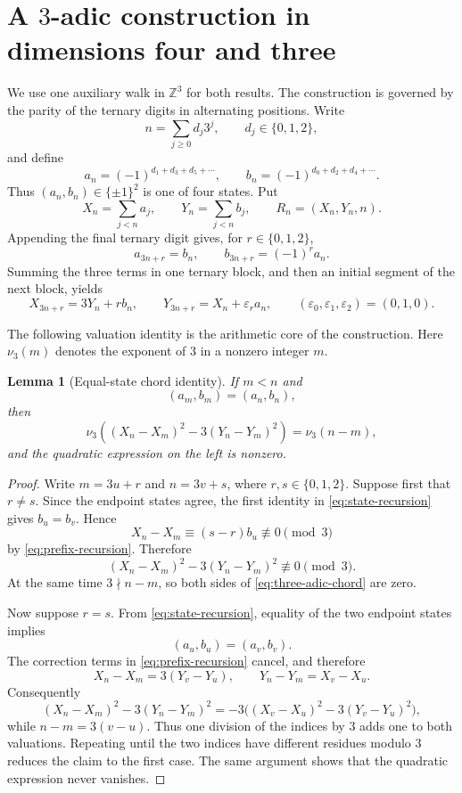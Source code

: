 \documentclass[11pt]{article}
\newtheorem*{lemma}{Lemma}
\begin{document}
\section{A $3$-adic construction in dimensions four and three}
\label{sec:three-four}

We use one auxiliary walk in $\mathbb Z^3$ for both results.  The
construction is governed by the parity of the ternary digits in alternating
positions.  Write
\[
 n=\sum_{j\ge 0} d_j3^j,\qquad d_j\in\{0,1,2\},
\]
and define
\[
 a_n=(-1)^{d_1+d_3+d_5+\cdots},\qquad
 b_n=(-1)^{d_0+d_2+d_4+\cdots}.
\]
Thus $(a_n,b_n)\in\{\pm1\}^2$ is one of four states.  Put
\[
 X_n=\sum_{j<n}a_j,\qquad Y_n=\sum_{j<n}b_j,
 \qquad R_n=(X_n,Y_n,n).
\]
Appending the final ternary digit gives, for $r\in\{0,1,2\}$,
\begin{equation}\label{eq:state-recursion}
 a_{3n+r}=b_n,\qquad b_{3n+r}=(-1)^r a_n.
\end{equation}
Summing the three terms in one ternary block, and then an initial segment of
the next block, yields
\begin{equation}\label{eq:prefix-recursion}
 X_{3n+r}=3Y_n+r b_n,\qquad
 Y_{3n+r}=X_n+\varepsilon_r a_n,
 \qquad (\varepsilon_0,\varepsilon_1,\varepsilon_2)=(0,1,0).
\end{equation}

The following valuation identity is the arithmetic core of the construction.
Here $\nu_3(m)$ denotes the exponent of $3$ in a nonzero integer $m$.

\begin{lemma}[Equal-state chord identity]\label{lem:three-adic-chord}
If $m<n$ and
\[
 (a_m,b_m)=(a_n,b_n),
\]
then
\begin{equation}\label{eq:three-adic-chord}
 \nu_3\!\left((X_n-X_m)^2-3(Y_n-Y_m)^2\right)=\nu_3(n-m),
\end{equation}
and the quadratic expression on the left is nonzero.
\end{lemma}

\begin{proof}
Write $m=3u+r$ and $n=3v+s$, where $r,s\in\{0,1,2\}$.  Suppose first
that $r\ne s$.  Since the endpoint states agree, the first identity in
\eqref{eq:state-recursion} gives $b_u=b_v$.  Hence
\[
 X_n-X_m\equiv(s-r)b_u\not\equiv0\pmod3
\]
by \eqref{eq:prefix-recursion}.  Therefore
\[
 (X_n-X_m)^2-3(Y_n-Y_m)^2\not\equiv0\pmod3.
\]
At the same time $3\nmid n-m$, so both sides of
\eqref{eq:three-adic-chord} are zero.

Now suppose $r=s$.  From \eqref{eq:state-recursion}, equality of the two
endpoint states implies
\[
 (a_u,b_u)=(a_v,b_v).
\]
The correction terms in \eqref{eq:prefix-recursion} cancel, and therefore
\[
 X_n-X_m=3(Y_v-Y_u),\qquad
 Y_n-Y_m=X_v-X_u.
\]
Consequently
\[
 (X_n-X_m)^2-3(Y_n-Y_m)^2
   =-3\bigl((X_v-X_u)^2-3(Y_v-Y_u)^2\bigr),
\]
while $n-m=3(v-u)$.  Thus one division of the indices by $3$ adds one to
both valuations.  Repeating until the two indices have different residues
modulo $3$ reduces the claim to the first case.  The same argument shows
that the quadratic expression never vanishes.
\end{proof}
\end{document}
